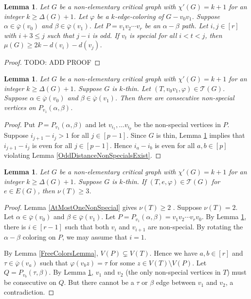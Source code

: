 \documentclass[12pt]{amsart}
\theoremstyle{plain}
\newtheorem{lem}[thm]{Lemma}
\theoremstyle{definition}
\theoremstyle{remark}
\newcommand{\fancy}[1]{\mathcal{#1}}
\newcommand{\T}{\fancy{T}}
\newcommand{\irange}[1]{\left[#1\right]}
\newcommand{\vph}{\varphi}
\newcommand{\vphn}{\overline{\varphi}}
\begin{document}
\begin{lem}\label{HelperOne}
Let $G$ be a non-elementary critical graph with $\chi'(G) = k+1$ for an integer $k \ge \Delta(G) + 1$.
Let $\vph$ be a $k$-edge-coloring of $G-v_0v_1$.  Suppose $\alpha \in \vphn(v_0)$ and $\beta \in \vphn(v_1)$.  
Let $P = v_1v_2\cdots v_r$ be an $\alpha-\beta$ path.  Let $i,j \in \irange{r}$ with $i + 3 \le j$ such that $j-i$ is odd.  If $v_t$ is special for all $i < t < j$, then
$\mu(G) \ge 2k - d(v_i) - d(v_j)$.
\end{lem}
\begin{proof}
TODO: ADD PROOF
\end{proof}

\begin{lem}\label{HelperFour}
Let $G$ be a non-elementary critical graph with $\chi'(G) = k+1$ for an integer $k \ge \Delta(G) + 1$.
Suppose $G$ is $k$-thin. Let $(T, v_0v_1, \vph) \in \T(G)$. Suppose $\alpha \in \vphn(v_0)$ and $\beta \in \vphn(v_1)$.  Then there are consecutive non-special vertices on $P_{v_1}(\alpha, \beta)$.
\end{lem}
\begin{proof}
Put $P = P_{v_1}(\alpha, \beta)$ and let $v_{i_1}, \ldots v_{i_p}$ be the non-special vertices in $P$.
Suppose $i_{j+1} - i_j > 1$ for all $j \in \irange{p-1}$. Since $G$ is thin, Lemma \ref{HelperOne} implies that $i_{j+1} - i_j$ is even for all $j \in \irange{p-1}$.  
Hence $i_a - i_b$ is even for all $a,b \in \irange{p}$ violating Lemma \ref{OddDistanceNonSpecialsExist}.
\end{proof}

\begin{lem}\label{HelperFive}
Let $G$ be a non-elementary critical graph with $\chi'(G) = k+1$ for an integer $k \ge \Delta(G) + 1$.
Suppose $G$ is $k$-thin. If $(T, e, \vph) \in \T(G)$ for $e \in E(G)$, then $\nu(T) \ge 3$.
\end{lem}
\begin{proof}
Lemma \ref{AtMostOneNonSpecial} gives $\nu(T) \ge 2$ .  Suppose $\nu(T) = 2$.  
Let $\alpha \in \vphn(v_0)$ and $\beta \in \vphn(v_1)$.  Let $P = P_{v_1}(\alpha, \beta) = v_1v_2\cdots v_rv_0$.
By Lemma \ref{HelperFour}, there is $i \in \irange{r-1}$ such that both $v_i$ and $v_{i+1}$ are non-special.  By rotating the $\alpha-\beta$ coloring on $P$, we may assume that $i=1$.

By Lemma \ref{FreeColorsLemma}, $V(P) \subsetneq V(T)$. Hence we have $a,b \in \irange{r}$ and $\tau \in \vphn(v_a)$ such that $\vph(v_bz) = \tau$ for some $z \in V(T) \setminus V(P)$.  
Let $Q = P_{v_b}(\tau, \beta)$. By Lemma \ref{HelperFour}, $v_1$ and $v_2$ (the only non-special vertices in $T$) must be consecutive on $Q$.  
But there cannot be a $\tau$ or $\beta$ edge between $v_1$ and $v_2$, a contradiction.
\end{proof}
\end{document}
